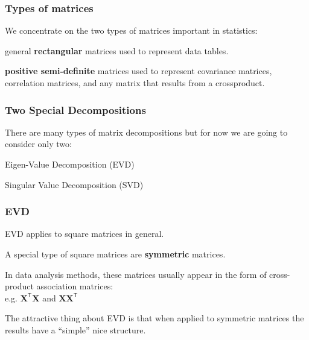 \documentclass[12pt]{beamer}\usepackage[]{graphicx}\usepackage[]{color}
\begin{document}

\begin{frame}
\frametitle{Types of matrices}

We concentrate on the two types of matrices important in statistics:
\eb

\bbi
 \item general \textbf{rectangular} matrices used to represent data tables.
 \item \textbf{positive semi-definite} matrices used to represent covariance matrices, 
correlation matrices, and any matrix that results from a crossproduct.
\ei

\end{frame}


\begin{frame}
\frametitle{Two Special Decompositions}

There are many types of matrix decompositions but for now we are going to consider only two:
\bbi
 \item Eigen-Value Decomposition (EVD)
 \item Singular Value Decomposition (SVD)
\ei
\eb

\end{frame}


\begin{frame}
\frametitle{EVD}

\bbi
  \item EVD applies to square matrices in general.
  \item A special type of square matrices are \textbf{symmetric} matrices.
  \item In data analysis methods, these matrices usually appear in the form of cross-product 
  association matrices: \\
  e.g. $\mathbf{X^\mathsf{T} X}$ and $\mathbf{X X^\mathsf{T}}$
  \item The attractive thing about EVD is that when applied to symmetric matrices the results have a ``simple'' nice structure.
  \ei
\eb

\end{frame}

  
\end{document}
